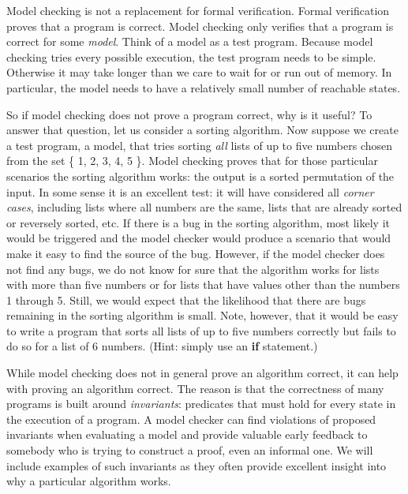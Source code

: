 \documentclass{report}
\begin{document}
Model checking is not a replacement for formal verification.
%
Formal verification proves that a program is correct.  Model checking only
verifies that a program is correct for some \emph{model}.  Think of
a model as a test program.
Because model checking tries every possible execution, the test
program needs to be simple. Otherwise it may take longer than we
care to wait for or run out of memory.
In particular, the model needs to have a relatively small number of
reachable states.

So if model checking does not prove a program correct, why is it
useful?
To answer that question, let us consider a sorting algorithm.
Now suppose we create a test program, a model, that tries sorting
\emph{all} lists of up to five numbers chosen from the set
\{ 1, 2, 3, 4, 5 \}.  Model checking proves that for those particular
scenarios the sorting algorithm works: the output is a sorted
permutation of the input.  In some sense it is an excellent test:
it will have considered all \emph{corner cases},
%
including lists where all
numbers are the same, lists that are already sorted or reversely
sorted, etc.  If there is a bug in the sorting algorithm, most
likely it would be triggered and the model checker would produce a
scenario that would make it easy to find the source of the bug.
However, if the model checker does not find any bugs, we do not
know for sure that the algorithm works for lists with more than
five numbers or for lists that have values other than the numbers
1 through 5.  Still, we would expect that the likelihood that there
are bugs remaining in the sorting algorithm is small.
Note, however, that it would be easy to write a program
that sorts all lists of up to five numbers correctly but fails to
do so for a list of 6 numbers.  (Hint: simply use an \textbf{if}
statement.)

%

While model checking does not in general prove an algorithm correct,
it can help with proving an algorithm correct.
The reason is that the correctness of many programs is built around
\emph{invariants}:
%
predicates that must hold for every state in the
execution of a program.  A model checker can find violations of
proposed invariants when evaluating a model and provide valuable early
feedback to somebody who is trying to construct a proof, even an
informal one.
We will include examples
of such invariants as they often provide excellent insight into
why a particular algorithm works.
\end{document}
